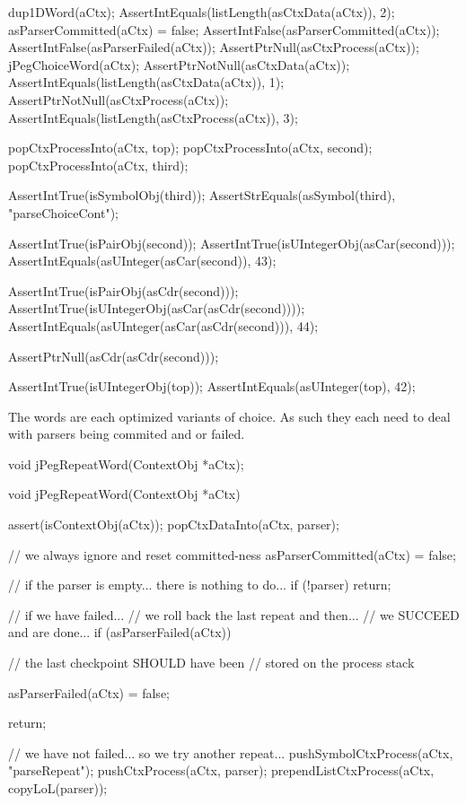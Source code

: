   dup1DWord(aCtx);
  AssertIntEquals(listLength(asCtxData(aCtx)), 2);
  asParserCommitted(aCtx) = false;
  AssertIntFalse(asParserCommitted(aCtx));
  AssertIntFalse(asParserFailed(aCtx));
  AssertPtrNull(asCtxProcess(aCtx));
  jPegChoiceWord(aCtx);
  AssertPtrNotNull(asCtxData(aCtx));
  AssertIntEquals(listLength(asCtxData(aCtx)), 1);
  AssertPtrNotNull(asCtxProcess(aCtx));
  AssertIntEquals(listLength(asCtxProcess(aCtx)), 3);
  
  popCtxProcessInto(aCtx, top);
  popCtxProcessInto(aCtx, second);
  popCtxProcessInto(aCtx, third);
  
  AssertIntTrue(isSymbolObj(third));
  AssertStrEquals(asSymbol(third), "parseChoiceCont");
  
  AssertIntTrue(isPairObj(second));
  AssertIntTrue(isUIntegerObj(asCar(second)));
  AssertIntEquals(asUInteger(asCar(second)), 43);
  
  AssertIntTrue(isPairObj(asCdr(second)));
  AssertIntTrue(isUIntegerObj(asCar(asCdr(second))));
  AssertIntEquals(asUInteger(asCar(asCdr(second))), 44);
  
  AssertPtrNull(asCdr(asCdr(second)));
  
  AssertIntTrue(isUIntegerObj(top));
  AssertIntEquals(asUInteger(top), 42);  
\stopCTest
\stopTestCase
\stopTestSuite

The  words are each optimized variants of 
choice. As such they each need to deal with parsers being commited and or 
failed. 

\startTestSuite[jPegRepeatWord]

\startCHeader
void jPegRepeatWord(ContextObj *aCtx);
\stopCHeader

\startCCode
void jPegRepeatWord(ContextObj *aCtx) {
  assert(isContextObj(aCtx));
  popCtxDataInto(aCtx, parser);

  // we always ignore and reset committed-ness
  asParserCommitted(aCtx) = false;

  // if the parser is empty... there is nothing to do...
  if (!parser) return;
  
  // if we have failed...
  // we roll back the last repeat and then...
  // we SUCCEED and are done...
  if (asParserFailed(aCtx)) {
    // the last checkpoint SHOULD have been
    // stored on the process stack
    
    asParserFailed(aCtx) = false;
    
    return;
  }
  
  // we have not failed... so we try another repeat...
  pushSymbolCtxProcess(aCtx, "parseRepeat");
  pushCtxProcess(aCtx, parser);
  prependListCtxProcess(aCtx, copyLoL(parser));
}
\stopCCode

